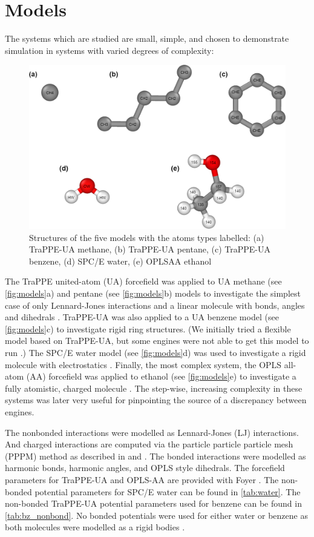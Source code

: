 \section{Models}

The systems which are studied are small, simple, and chosen to demonstrate simulation in systems with varied degrees of complexity:
\begin{figure}[h!]
    \centering
    \includegraphics[width=\linewidth]{figures/rep_study/models.png}
    \caption{Structures of the five models with the atoms types labelled: (a) TraPPE-UA methane, (b) TraPPE-UA pentane, (c) TraPPE-UA benzene, (d) SPC/E water, (e) OPLSAA ethanol}\label{fig:models}
\end{figure}
The TraPPE united-atom (UA) forcefield was applied to UA methane (see \autoref{fig:models}a) and pentane (see \autoref{fig:models}b) models to investigate the simplest case of only Lennard-Jones interactions and a linear molecule with bonds, angles and dihedrals \citep{Martin1998}.
TraPPE-UA was also applied to a UA benzene model (see \autoref{fig:models}c) to investigate rigid ring structures.
(We initially tried a flexible model based on TraPPE-UA, but some engines were not able to get this model to run \citep{Yiannourakou2019}.)
The SPC/E water model (see \autoref{fig:models}d) was used to investigate a rigid molecule with electrostatics \citep{Berendsen1987a}.
Finally, the most complex system, the OPLS all-atom (AA) forcefield was applied to ethanol (see \autoref{fig:models}e) to investigate a fully atomistic, charged molecule \citep{Jorgensen1988}.
The step-wise, increasing complexity in these systems was later very useful for pinpointing the source of a discrepancy between engines.

The nonbonded interactions were modelled as Lennard-Jones (LJ) interactions. 
And charged interactions are computed via the particle particle particle mesh (PPPM) method as described in \citet{Darden1993} and \citet{Lebard2012}. 
The bonded interactions were modelled as harmonic bonds, harmonic angles, and OPLS style dihedrals.
The forcefield parameters for TraPPE-UA and OPLS-AA are provided with Foyer \citep{foyer}. 
The non-bonded potential parameters for SPC/E water can be found in \autoref{tab:water}. 
The non-bonded TraPPE-UA potential parameters used for benzene can be found in \autoref{tab:bz_nonbond}. No bonded potentials were used for either water or benzene as both molecules were modelled as a rigid bodies \citep{Nguyen2011a, Glaser2020a}. 

